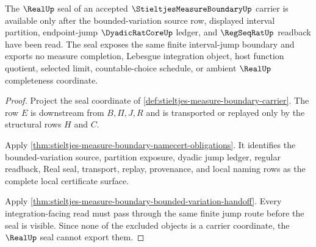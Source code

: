\begin{theorem}
\label{thm:stieltjes-measure-boundary-real-seal-nonescape}
The $\RealUp$ seal of an accepted $\StieltjesMeasureBoundaryUp$ carrier is available only after the bounded-variation source row, displayed interval partition, endpoint-jump $\DyadicRatCoreUp$ ledger, and $\RegSeqRatUp$ readback have been read. The seal exposes the same finite interval-jump boundary and exports no measure completion, Lebesgue integration object, host function quotient, selected limit, countable-choice schedule, or ambient $\RealUp$ completeness coordinate.
\end{theorem}
\begin{proof}
Project the seal coordinate of \autoref{def:stieltjes-measure-boundary-carrier}. The row $E$ is downstream from $B,\Pi,J,R$ and is transported or replayed only by the structural rows $H$ and $C$.

Apply \autoref{thm:stieltjes-measure-boundary-namecert-obligations}. It identifies the bounded-variation source, partition exposure, dyadic jump ledger, regular readback, Real seal, transport, replay, provenance, and local naming rows as the complete local certificate surface.

Apply \autoref{thm:stieltjes-measure-boundary-bounded-variation-handoff}. Every integration-facing read must pass through the same finite jump route before the seal is visible. Since none of the excluded objects is a carrier coordinate, the $\RealUp$ seal cannot export them.
\end{proof}


\begin{closurestatus}{\StieltjesMeasureBoundaryUp}
  \theoryclosure{\seedClosure}
  \formalstatus{\unformalizedV}
\end{closurestatus}
